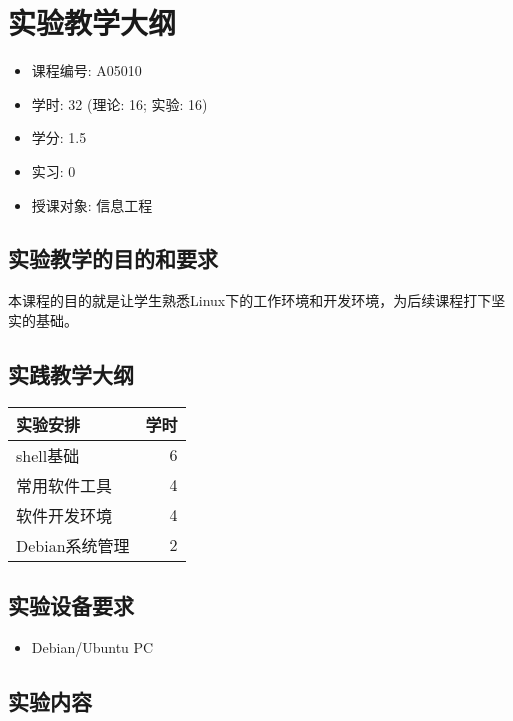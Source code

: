 \documentclass[12pt,a4paper]{article}
\begin{document}
\clearpage
\section{实验教学大纲}

\begin{itemize}
\item 课程编号: A05010
\item 学时: 32 (理论: 16; 实验: 16)
\item 学分: 1.5
\item 实习: 0
\item 授课对象: 信息工程
\end{itemize}

\subsection{实验教学的目的和要求}
本课程的目的就是让学生熟悉Linux下的工作环境和开发环境，为后续课程打下坚实的基础。

\subsection{实践教学大纲}

\begin{center}
  \begin{tabular}{lr}
    \hline
    实验安排        &  学时  \\
    \hline
    shell基础       &     6  \\
    常用软件工具    &     4  \\
    软件开发环境    &     4  \\
    Debian系统管理  &     2  \\
    \hline
  \end{tabular}
\end{center}

\subsection{实验设备要求}

\begin{itemize}
\item Debian/Ubuntu PC
\end{itemize}

\subsection{实验内容}
\end{document}
